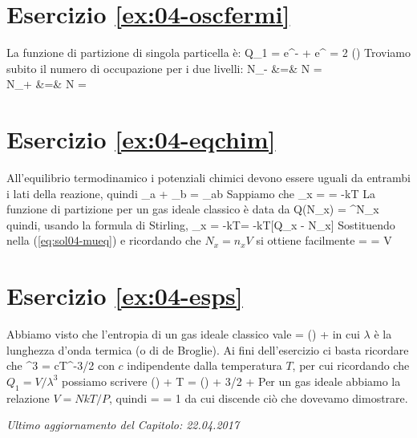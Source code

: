 \section*{Esercizio \ref{ex:04-oscfermi}}
La funzione di partizione di singola particella è:
\be
Q_1 = e^{-\beta\varepsilon} + e^{\beta\varepsilon} = 2 \cosh(\beta\varepsilon)
\ee
Troviamo subito il numero di occupazione per i due livelli:
\bea
N_{-} &=& N 
=  \nonumber \\
N_{+} &=& N 
= 
\eea

\section*{Esercizio \ref{ex:04-eqchim}}

All'equilibrio termodinamico i potenziali chimici devono essere uguali da entrambi i lati della reazione, quindi
\be
	\label{eq:sol04-mueq}
	\mu_a + \mu_b = \mu_{ab}
\ee
	Sappiamo che 
\be
	\mu_x = = -kT
\ee
	La funzione di partizione per un gas ideale classico è data da
\be
	Q(N_x) = \left[Q_x\right]^{N_x}
\ee
	quindi, usando la formula di Stirling, 
\be
	\mu_x = -kT\left[ N_x\ln Q_x - N_x\ln N_x + N_x \right] = -kT[\ln Q_x - \ln N_x]
\ee
	Sostituendo nella (\ref{eq:sol04-mueq}) e ricordando che $N_x = n_x V$ si ottiene facilmente
\be 
	= \ln {} \quad\rightarrow\quad 
	 = V
\ee

\section*{Esercizio \ref{ex:04-esps}}
Abbiamo visto  che l'entropia di un gas ideale classico vale
\be
{} = \ln\left(\right) + 
\ee
in cui $\lambda$ è la lunghezza d'onda termica (o di de Broglie). Ai fini dell'esercizio ci basta ricordare che
\be
\lambda^3 = cT^{-3/2}
\ee
con $c$ indipendente dalla temperatura $T$,  per cui ricordando che $Q_1 = V/\lambda^3$ possiamo scrivere
\be
\ln\left(\right) + T =
\ln\left(\right) + 3/2 + 
\ee
Per un gas ideale abbiamo la relazione $V = NkT/P$, quindi
\be
{} =  = 1
\ee
da cui discende ciò che dovevamo dimostrare.


\vskip 0.75cm
\begin{flushright}
{\em Ultimo aggiornamento del Capitolo: 22.04.2017}
\end{flushright}
